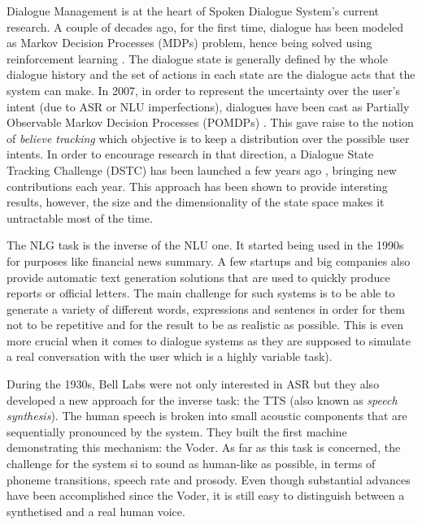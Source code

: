             Dialogue Management is at the heart of Spoken Dialogue System's current research. A couple of decades ago, for the first time, dialogue has been modeled as Markov Decision Processes (MDPs) problem, hence being solved using reinforcement learning \cite{Eckert1997}. The dialogue state is generally defined by the whole dialogue history and the set of actions in each state are the dialogue acts that the system can make. In 2007, in order to represent the uncertainty over the user's intent (due to ASR or NLU imperfections), dialogues have been cast as Partially Observable Markov Decision Processes (POMDPs) \cite{Williams2007}. This gave raise to the notion of \textit{believe tracking} which objective is to keep a distribution over the possible user intents. In order to encourage research in that direction, a Dialogue State Tracking Challenge (DSTC) has been launched a few years ago \cite{Williams2012b}, bringing new contributions each year. This approach has been shown to provide intersting results, however, the size and the dimensionality of the state space makes it untractable most of the time.

            The NLG task is the inverse of the NLU one. It started being used in the 1990s for purposes like financial news summary. A few startups and big companies also provide automatic text generation solutions that are used to quickly produce reports or official letters. The main challenge for such systems is to be able to generate a variety of different words, expressions and sentencs in order for them not to be repetitive and for the result to be as realistic as possible. This is even more crucial when it comes to dialogue systems as they are supposed to simulate a real conversation with the user which is a highly variable task).

            During the 1930s, Bell Labs were not only interested in ASR but they also developed a new approach for the inverse task: the TTS (also known as \textit{speech synthesis}). The human speech is broken into small acoustic components that are sequentially pronounced by the system. They built the first machine demonstrating this mechanism: the Voder. As far as this task is concerned, the challenge for the system si to sound as human-like as possible, in terms of phoneme transitions, speech rate and prosody. Even though substantial advances have been accomplished since the Voder, it is still easy to distinguish between a synthetised and a real human voice.

